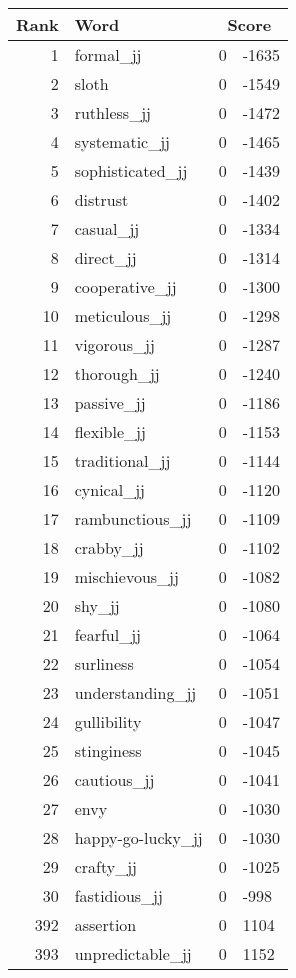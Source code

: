 \begin{longtable}[!htbp]{| rlr@{.}l |}
    \hline
    \textbf{Rank} & \textbf{Word} & \multicolumn{2}{c|}{\textbf{Score}} \\
    \hline
    \endhead
    1 & formal\_jj & 0 & -1635 \\
    2 & sloth & 0 & -1549 \\
    3 & ruthless\_jj & 0 & -1472 \\
    4 & systematic\_jj & 0 & -1465 \\
    5 & sophisticated\_jj & 0 & -1439 \\
    6 & distrust & 0 & -1402 \\
    7 & casual\_jj & 0 & -1334 \\
    8 & direct\_jj & 0 & -1314 \\
    9 & cooperative\_jj & 0 & -1300 \\
    10 & meticulous\_jj & 0 & -1298 \\
    11 & vigorous\_jj & 0 & -1287 \\
    12 & thorough\_jj & 0 & -1240 \\
    13 & passive\_jj & 0 & -1186 \\
    14 & flexible\_jj & 0 & -1153 \\
    15 & traditional\_jj & 0 & -1144 \\
    16 & cynical\_jj & 0 & -1120 \\
    17 & rambunctious\_jj & 0 & -1109 \\
    18 & crabby\_jj & 0 & -1102 \\
    19 & mischievous\_jj & 0 & -1082 \\
    20 & shy\_jj & 0 & -1080 \\
    21 & fearful\_jj & 0 & -1064 \\
    22 & surliness & 0 & -1054 \\
    23 & understanding\_jj & 0 & -1051 \\
    24 & gullibility & 0 & -1047 \\
    25 & stinginess & 0 & -1045 \\
    26 & cautious\_jj & 0 & -1041 \\
    27 & envy & 0 & -1030 \\
    28 & happy-go-lucky\_jj & 0 & -1030 \\
    29 & crafty\_jj & 0 & -1025 \\
    30 & fastidious\_jj & 0 & -998 \\
    392 & assertion & 0 & 1104 \\
    393 & unpredictable\_jj & 0 & 1152 \\

\end{longtable}
